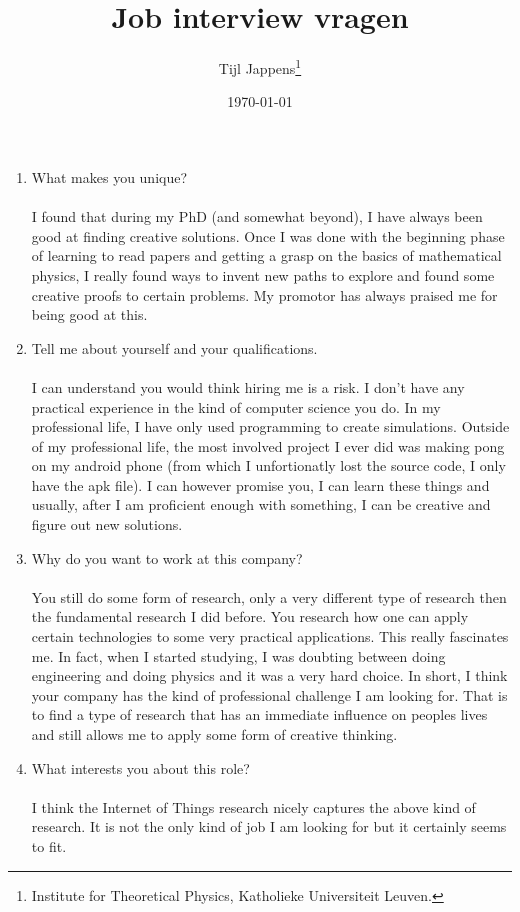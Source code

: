 \documentclass[12pt,a4paper,twoside]{article}
\title{Job interview vragen}
\author{Tijl Jappens\footnote{Institute for Theoretical Physics, Katholieke Universiteit Leuven.}}
\date{\today}
\begin{document}
	\maketitle 
	\begin{enumerate}
		\item What makes you unique?\\\\
		I found that during my PhD (and somewhat beyond), I have always been good at finding creative solutions. Once I was done with the beginning phase of learning to read papers and getting a grasp on the basics of mathematical physics, I really found ways to invent new paths to explore and found some creative proofs to certain problems. My promotor has always praised me for being good at this.
		\item Tell me about yourself and your qualifications.\\\\
		I can understand you would think hiring me is a risk. I don't have any practical experience in the kind of computer science you do. In my professional life, I have only used programming to create simulations. Outside of my professional life, the most involved project I ever did was making pong on my android phone (from which I unfortionatly lost the source code, I only have the apk file). I can however promise you, I can learn these things and usually, after I am proficient enough with something, I can be creative and figure out new solutions.
		\item Why do you want to work at this company?\\\\
		You still do some form of research, only a very different type of research then the fundamental research I did before. You research how one can apply certain technologies to some very practical applications. This really fascinates me. In fact, when I started studying, I was doubting between doing engineering and doing physics and it was a very hard choice. In short, I think your company has the kind of professional challenge I am looking for. That is to find a type of research that has an immediate influence on peoples lives and still allows me to apply some form of creative thinking.
		\item What interests you about this role?\\\\
		I think the Internet of Things research nicely captures the above kind of research. It is not the only kind of job I am looking for but it certainly seems to fit.

\end{enumerate}
\end{document}
